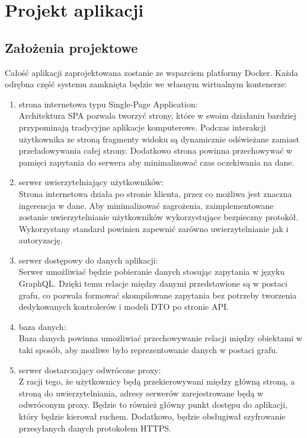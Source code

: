 
\chapter{Projekt aplikacji}
\section{Założenia projektowe}
	Całość aplikacji zaprojektowana zostanie ze wsparciem platformy Docker.
	Każda odrębna część systemu zamknięta będzie we własnym wirtualnym kontenerze:
	\begin{enumerate}
		\item strona internetowa typu Single-Page Application:\\
			Architektura SPA pozwala tworzyć strony, które w swoim działaniu bardziej przypominają tradycyjne aplikacje komputerowe.
			Podczas interakcji użytkownika ze stroną fragmenty widoku są dynamicznie odświeżane zamiast przeładowywania całej strony.
			Dodatkowo strona powinna przechowywać w pamięci zapytania do serwera aby minimalizować czas oczekiwania na dane.

		\item serwer uwierzytelniający użytkowników:\\
			Strona internetowa działa po stronie klienta, przez co możliwa jest znaczna ingerencja w dane.
			Aby minimalizować zagrożenia, zaimplementowane zostanie uwierzytelnianie użytkowników wykorzystujące bezpieczny protokół.
			Wykorzystany standard powinien zapewnić zarówno uwierzytelnianie jak i autoryzację.

		\item serwer dostępowy do danych aplikacji:\\
			Serwer umożliwiać będzie pobieranie danych stosując zapytania w języku GraphQL\@.
			Dzięki temu relacje między danymi przedstawione są w postaci grafu,
			co pozwala formować skompilowane zapytania bez potrzeby tworzenia dedykowanych kontrolerów i modeli DTO po stronie API\@.

		\item baza danych:\\
			Baza danych powinna umożliwiać przechowywanie relacji między obiektami w taki sposób,
			aby możliwe było reprezentowanie danych w postaci grafu.

		\item serwer dostarczający odwrócone proxy:\\
			Z racji tego, że użytkownicy będą przekierowywani między główną stroną, a stroną do uwierzytelniania,
			adresy serwerów zarejestrowane będą w odwróconym proxy.
			Będzie to również główny punkt dostępu do aplikacji, który będzie kierował ruchem.
			Dodatkowo, będzie obsługiwał szyfrowanie przesyłanych danych protokołem HTTPS\@.

		\end{enumerate}
		
